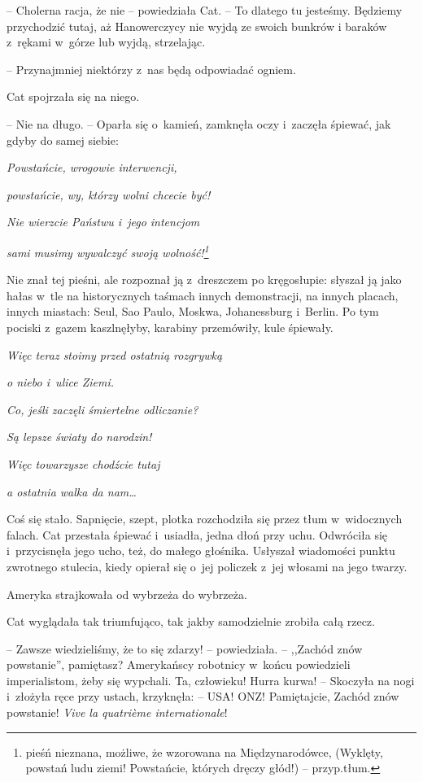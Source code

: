 \documentclass[oneside,polish,11pt,sfheadings]{mwbk}
\begin{document}
-- Cholerna racja, że nie -- powiedziała Cat. -- To dlatego tu jesteśmy.
Będziemy przychodzić tutaj, aż Hanowerczycy nie wyjdą ze swoich bunkrów
i baraków z~rękami w~górze lub wyjdą, strzelając.

-- Przynajmniej niektórzy z~nas będą odpowiadać ogniem.

Cat spojrzała się na niego. 

-- Nie na długo. -- Oparła się o~kamień,
zamknęła oczy i~zaczęła śpiewać, jak gdyby do samej siebie:

\emph{Powstańcie, wrogowie interwencji,}

\emph{powstańcie, wy, którzy wolni chcecie być!}

\emph{Nie wierzcie Państwu i~jego intencjom}

\emph{sami musimy wywalczyć swoją wolność!\footnote{pieśń nieznana, możliwe,
że wzorowana na Międzynarodówce, (Wyklęty, powstań ludu ziemi!
Powstańcie, których dręczy głód!) -- przyp.tłum.}}

Nie znał tej pieśni, ale rozpoznał ją z~dreszczem po kręgosłupie:
słyszał ją jako hałas w~tle na historycznych taśmach innych
demonstracji, na innych placach, innych miastach: Seul, Sao Paulo,
Moskwa, Johanessburg i~Berlin. Po tym pociski z~gazem kaszlnęłyby,
karabiny przemówiły, kule śpiewały.

\emph{Więc teraz stoimy przed ostatnią rozgrywką}

\emph{o niebo i~ulice Ziemi.}

\emph{Co, jeśli zaczęli śmiertelne odliczanie?}

\emph{Są lepsze światy do narodzin!}

\emph{Więc towarzysze chodźcie tutaj}

\emph{a ostatnia walka da nam\ldots}

Coś się stało. Sapnięcie, szept, plotka rozchodziła się przez tłum w~widocznych falach. Cat przestała śpiewać i~usiadła, jedna dłoń przy
uchu. Odwróciła się i~przycisnęła jego ucho, też, do małego głośnika.
Usłyszał wiadomości punktu zwrotnego stulecia, kiedy opierał się o~jej
policzek z~jej włosami na jego twarzy.

Ameryka strajkowała od wybrzeża do wybrzeża.

Cat wyglądała tak triumfująco, tak jakby samodzielnie zrobiła całą
rzecz. 

-- Zawsze wiedzieliśmy, że to się zdarzy! -- powiedziała. -- ,,Zachód
znów powstanie'', pamiętasz? Amerykańscy robotnicy w~końcu powiedzieli
imperialistom, żeby się wypchali. Ta, człowieku! Hurra kurwa! -- Skoczyła
na nogi i~złożyła ręce przy ustach, krzyknęła: -- USA! ONZ! Pamiętajcie,
Zachód znów powstanie! \emph{Vive la quatrième internationale}!
\end{document}
